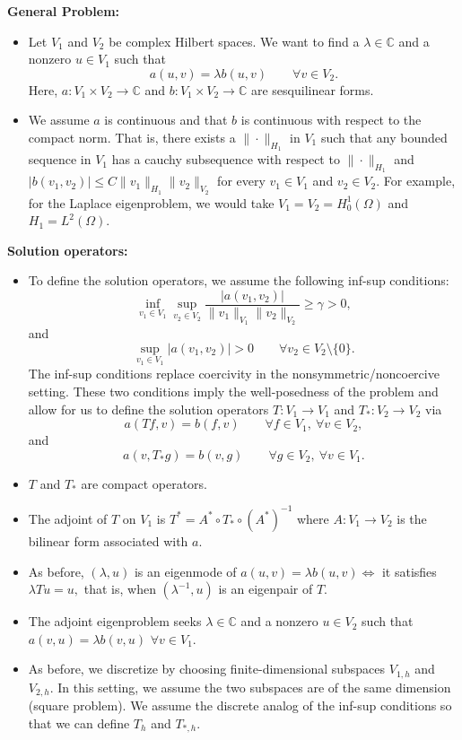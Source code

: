 \documentclass[12pt,a4paper]{article}
\theoremstyle{boldthm}
\theoremstyle{bolddefn}
\begin{document}
\textbf{General Problem:}
\begin{itemize}
    \item Let $V_1$ and $V_2$ be complex Hilbert spaces. We want to find a $\lambda \in \mathbb{C}$ and a nonzero $u \in V_1$ such that 
    $$a(u, v) = \lambda b(u, v) \qquad \forall v \in V_2.$$
    Here, $a:V_1 \times V_2\rightarrow \mathbb{C}$ and $b:V_1 \times V_2 \rightarrow \mathbb{C}$ are sesquilinear forms. 
    \item We assume $a$ is continuous and that $b$ is continuous with respect to the compact norm. That is, there exists a $\|\cdot\|_{H_1}$ in $V_1$ such that any bounded sequence in $V_1$ has a cauchy subsequence with respect to $\|\cdot\|_{H_1}$ and $|b(v_1, v_2)| \le C \| v_1 \|_{H_1} \|v_2\|_{V_2}$ for every $v_1 \in V_1$ and $v_2 \in V_2.$ For example, for the Laplace eigenproblem, we would take $V_1 = V_2 = H_0^1(\Omega)$ and $H_1 = L^2(\Omega).$
\end{itemize}

\textbf{Solution operators:}
\begin{itemize}
    \item To define the solution operators, we assume the following inf-sup conditions:
    $$
    \inf_{v_1\in V_1}
    \sup_{v_2\in V_2}
    \frac{|a(v_1,v_2)|}{\|v_1\|_{V_1}\|v_2\|_{V_2}}
    \geq \gamma>0,
    $$
    and
    $$
    \sup_{v_1\in V_1}
    |a(v_1,v_2)|>0
    \qquad
    \forall v_2\in V_2\setminus\{0\}.
    $$
    The inf-sup conditions replace coercivity in the nonsymmetric/noncoercive setting. These two conditions imply the well-posedness of the problem and allow for us to define the solution operators $T:V_1\to V_1$ and $T_*:V_2\to V_2$ via
    $$
    a(Tf,v)=b(f,v)
    \qquad
    \forall f\in V_1,\ \forall v\in V_2,
    $$
    and
    $$
    a(v,T_*g)=b(v,g)
    \qquad
    \forall g\in V_2,\ \forall v\in V_1.
    $$
    
    \item $T$ and $T_*$ are compact operators.
    \item The adjoint of $T$ on $V_1$ is $T^* = A^* \circ T_* \circ (A^*)^{-1}$ where $A:V_1 \rightarrow V_2$ is the bilinear form associated with $a.$
    \item As before, $(\lambda, u)$ is an eigenmode of $a(u, v) = \lambda b(u, v) \iff$ it satisfies $\lambda T u = u,$ that is, when $(\lambda^{-1}, u)$ is an eigenpair of $T.$
    \item The adjoint eigenproblem seeks $\lambda \in \mathbb{C}$ and a nonzero $u \in V_2$ such that $a(v, u)=\lambda b(v, u)$ $\forall v \in V_1.$
    \item As before, we discretize by choosing finite-dimensional subspaces $V_{1, h}$ and $V_{2, h}.$ In this setting, we assume the two subspaces are of the same dimension (square problem). We assume the discrete analog of the inf-sup conditions so that we can define $T_h$ and $T_{*, h}.$
\end{itemize}
\end{document}
